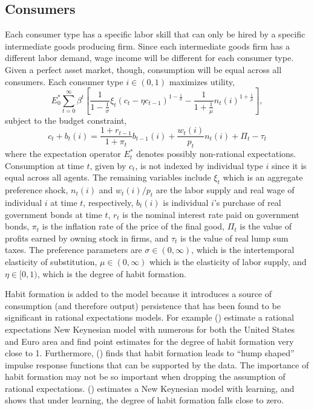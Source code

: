 \documentclass[12pt]{article}
\newcommand{\bdm}{\begin{displaymath}}
\newcommand{\edm}{\end{displaymath}}
\newcommand{\citee}[1]{\citename{#1} (\citeyear{#1})}
\begin{document}
\subsection{Consumers}
Each consumer type has a specific labor skill that can only be hired by a specific intermediate goods producing firm.  Since each intermediate goods firm has a different labor demand, wage income will be different for each consumer type.  Given a perfect asset market, though, consumption will be equal across all consumers.  Each consumer type $i \in (0,1)$ maximizes utility,
\bdm E_0^* \sum_{t=0}^{\infty} \beta^t \left[ \frac{1}{1-\frac{1}{\sigma}} \xi_t \left(c_t - \eta c_{t-1}\right)^{1-\frac{1}{\sigma}} - \frac{1}{1+\frac{1}{\mu}} n_t(i)^{1+\frac{1}{\mu}} \right], \edm
subject to the budget constraint,
\bdm c_t + b_t(i) = \frac{1+r_{t-1}}{1+\pi_t} b_{t-1}(i) + \frac{w_t(i)}{p_t} n_t(i) + \Pi_t - \tau_t \edm
where the expectation operator $E_t^*$ denotes possibly non-rational expectations.  Consumption at time $t$, given by $c_t$, is not indexed by individual type $i$ since it is equal across all agents.  The remaining variables include $\xi_t$ which is an aggregate preference shock, $n_t(i)$ and $w_t(i)/p_t$ are the labor supply and real wage of individual $i$ at time $t$, respectively, $b_t(i)$ is individual $i$'s purchase of real government bonds at time $t$, $r_t$ is the nominal interest rate paid on government bonds, $\pi_t$ is the inflation rate of the price of the final good, $\Pi_t$ is the value of profits earned by owning stock in firms, and $\tau_t$ is the value of real lump sum taxes.  The preference parameters are $\sigma \in (0,\infty)$, which is the intertemporal elasticity of substitution, $\mu \in (0,\infty)$ which is the elasticity of labor supply, and $\eta \in [0,1)$, which is the degree of habit formation.  

Habit formation is added to the model because it introduces a source of consumption (and therefore output) persistence that has been found to be significant in rational expectations models.  For example \citee{smetswouters2005} estimate a rational expectations New Keynesian model with numerous for both the United States and Euro area and find point estimates for the degree of habit formation very close to 1.  Furthermore, \citee{fuhrer2000} finds that habit formation leads to ``hump shaped'' impulse response functions that can be supported by the data.  The importance of habit formation may not be so important when dropping the assumption of rational expectations.  \citee{milani2005} estimates a New Keynesian model with learning, and shows that under learning, the degree of habit formation falls close to zero.
\end{document}
